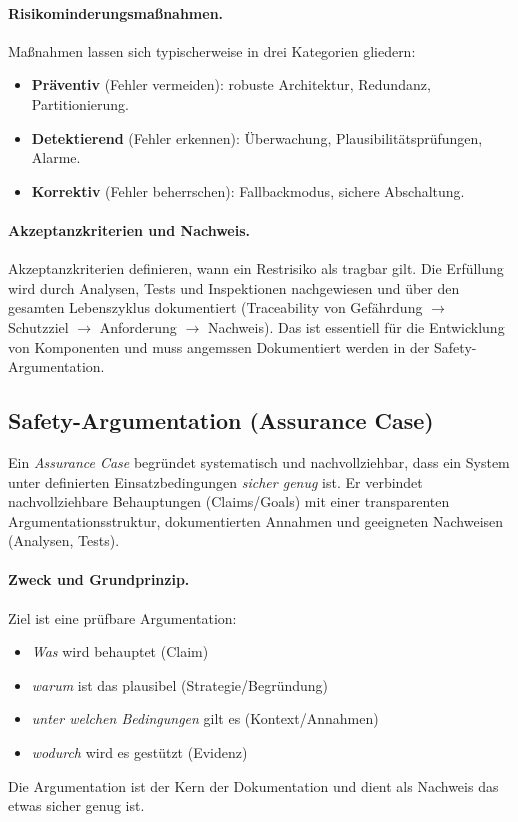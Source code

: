 \paragraph{Risikominderungsmaßnahmen.}
Maßnahmen lassen sich typischerweise in drei Kategorien gliedern:
\begin{itemize}
  \item \textbf{Präventiv} (Fehler vermeiden): robuste Architektur, Redundanz, Partitionierung.
  \item \textbf{Detektierend} (Fehler erkennen): Überwachung, Plausibilitätsprüfungen, Alarme.
  \item \textbf{Korrektiv} (Fehler beherrschen): Fallbackmodus, sichere Abschaltung. 
\end{itemize}

\paragraph{Akzeptanzkriterien und Nachweis.}
Akzeptanzkriterien definieren, wann ein Restrisiko als tragbar gilt. Die Erfüllung wird durch Analysen, Tests und Inspektionen nachgewiesen und über den gesamten Lebenszyklus dokumentiert (Traceability von Gefährdung $\rightarrow$ Schutzziel $\rightarrow$ Anforderung $\rightarrow$ Nachweis).
Das ist essentiell für die Entwicklung von Komponenten und muss angemssen Dokumentiert werden in der Safety-Argumentation.

\subsection{Safety-Argumentation (Assurance Case)}
Ein \emph{Assurance Case} begründet systematisch und nachvollziehbar, dass ein System unter definierten Einsatzbedingungen \emph{sicher genug} ist. 
Er verbindet nachvollziehbare Behauptungen (Claims/Goals) mit einer transparenten Argumentationsstruktur, dokumentierten Annahmen und geeigneten Nachweisen (Analysen, Tests).

\paragraph{Zweck und Grundprinzip.}
Ziel ist eine prüfbare Argumentation: 
\begin{itemize}
    \item \emph{Was} wird behauptet (Claim)
    \item \emph{warum} ist das plausibel (Strategie/Begründung)
    \item \emph{unter welchen Bedingungen} gilt es (Kontext/Annahmen)
    \item \emph{wodurch} wird es gestützt (Evidenz)
\end{itemize}
Die Argumentation ist der Kern der Dokumentation und dient als Nachweis das etwas sicher genug ist.

